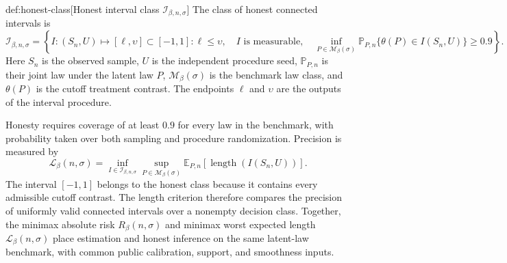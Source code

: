 \begin{definitionv}{def:honest-class}[Honest interval class $\mathcal I_{\beta,n,\sigma}$]
The class of honest connected intervals is
\[
\mathcal I_{\beta,n,\sigma}
=
\left\{
I:(S_n,U)\mapsto[\ell,\upsilon]\subset[-1,1]:
\ell\le\upsilon,\quad
I\text{ is measurable},\quad
\inf_{P\in\mathcal M_\beta(\sigma)}
\mathbb P_{P,n}\{\theta(P)\in I(S_n,U)\}\ge0.9
\right\}.
\]
Here \(S_n\) is the observed sample, \(U\) is the independent procedure seed, \(\mathbb P_{P,n}\) is their joint law under the latent law \(P\), \(\mathcal M_\beta(\sigma)\) is the benchmark law class, and \(\theta(P)\) is the cutoff treatment contrast. The endpoints \(\ell\) and \(\upsilon\) are the outputs of the interval procedure.
\end{definitionv}

Honesty requires coverage of at least \(0.9\) for every law in the benchmark, with probability taken over both sampling and procedure randomization. Precision is measured by
\[
\mathcal L_\beta(n,\sigma)
=
\inf_{I\in\mathcal I_{\beta,n,\sigma}}
\sup_{P\in\mathcal M_\beta(\sigma)}
\mathbb E_{P,n}\!\left[\operatorname{length}(I(S_n,U))\right].
\]
The interval \([-1,1]\) belongs to the honest class because it contains every admissible cutoff contrast. The length criterion therefore compares the precision of uniformly valid connected intervals over a nonempty decision class. Together, the minimax absolute risk \(R_\beta(n,\sigma)\) and minimax worst expected length \(\mathcal L_\beta(n,\sigma)\) place estimation and honest inference on the same latent-law benchmark, with common public calibration, support, and smoothness inputs.
